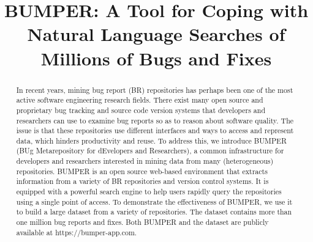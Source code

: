 \documentclass[conference]{IEEEtran}
\begin{document}
\title{BUMPER: A Tool for Coping with Natural Language Searches of Millions of Bugs and Fixes}


\author{
\and
{}

}

\maketitle


\begin{abstract}
In recent years, mining bug report (BR) repositories has perhaps been one of the most active software engineering research fields. There exist many open source and proprietary bug tracking and source code version systems that developers and researchers can use to examine bug reports so as to reason about software quality. The issue is that these repositories use different interfaces and ways to access and represent data, which hinders productivity and reuse. To address this, we introduce BUMPER (BUg Metarepository for dEvelopers and Researchers), a common infrastructure for developers and researchers interested in mining data from many (heterogeneous) repositories. BUMPER is an open source web-based environment that extracts information from a variety of BR repositories and version control systems. It is equipped with a powerful search engine to help users rapidly query the repositories using a single point of access. To demonstrate the effectiveness of BUMPER, we use it to build a large dataset from a variety of repositories. The dataset contains more than one million bug reports and fixes. Both BUMPER and the dataset are publicly available at https://bumper-app.com.

\end{abstract}


\IEEEpeerreviewmaketitle
\end{document}
